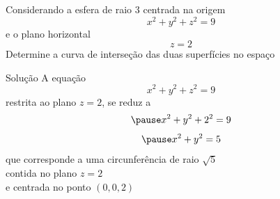 \begin{question}
  Considerando a esfera de raio $3$ centrada na origem
  \[
    x^2 + y^2 + z^2 = 9
  \]
  e o plano horizontal
  \[
    z = 2
  \]
  Determine a curva de interseção das duas superfícies no espaço
\end{question}

\begin{resolution}{Solução}
  A equação
  \[
    x^2 + y^2 + z^2 = 9
  \]
  \pause
  restrita ao plano $z=2$,
  \pause
  se reduz a
  \[
    \pause
    x^2 + y^2 + 2^2 = 9
  \]
  \[
    \pause
    x^2 + y^2 = 5
  \]
  \pause
  que corresponde a uma circunferência de raio $\sqrt{5}$ \\
  \pause
  contida no plano $z = 2$ \\
  \pause
  e centrada no ponto \((0, 0, 2)\)
\end{resolution}



